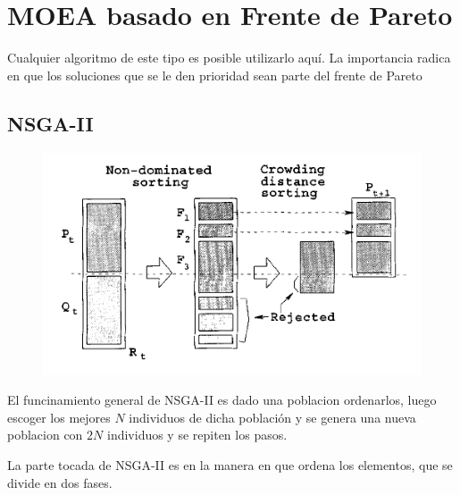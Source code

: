 \section{MOEA basado en Frente de Pareto}

Cualquier algoritmo de este tipo es posible utilizarlo aqu\'i. La importancia radica en que los soluciones que se le den prioridad sean parte del frente de Pareto

\subsection{NSGA-II}

\begin{figure}[H]
    \includegraphics[width=\linewidth]{Pictures/nsga2.png}
    \label{nsga2}
\end{figure}

El funcinamiento general de NSGA-II es dado una poblacion ordenarlos, luego escoger los mejores $N$ individuos de dicha poblaci\'on y se genera una nueva poblacion con $2N$ individuos y se repiten los pasos.

La parte tocada de NSGA-II es en la manera en que ordena los elementos, que se divide en dos fases.

